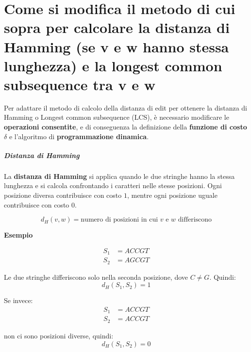 \chapter{Come si modifica il metodo di cui sopra per calcolare la 
distanza di Hamming (se v e w hanno stessa lunghezza) e la 
longest common subsequence tra v e w}

Per adattare il metodo di calcolo della distanza di edit per ottenere la distanza 
di Hamming o Longest common subsequence (LCS), 
è necessario modificare le \textbf{operazioni consentite}, 
e di conseguenza la definizione della \textbf{funzione di costo} $\delta$ 
e l'algoritmo di \textbf{programmazione dinamica}.

\paragraph{Distanza di Hamming}

La \textbf{distanza di Hamming} si applica quando le due stringhe hanno la stessa 
lunghezza e si calcola confrontando i caratteri nelle stesse posizioni. 
Ogni posizione diversa contribuisce con costo $1$, mentre ogni posizione uguale 
contribuisce con costo $0$.

\begin{equation}
    d_H(v, w) = \text{numero di posizioni in cui } v \text{ e } w \text{ differiscono}
\end{equation}

\textbf{Esempio}

\begin{align*}
    S_1 &= ACCGT \\
    S_2 &= AGCGT
\end{align*}

Le due stringhe differiscono solo nella seconda posizione, dove $C \neq G$. Quindi:
\begin{equation}
    d_H(S_1,S_2)=1
\end{equation}

Se invece:
\begin{align*}
    S_1 &= ACCGT \\
    S_2 &= ACCGT
\end{align*}

non ci sono posizioni diverse, quindi:
\begin{equation}
    d_H(S_1,S_2)=0
\end{equation}


